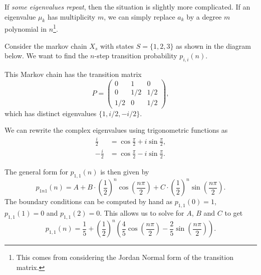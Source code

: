 \documentclass[a4paper]{scrartcl}
\begin{document}
If \emph{some eigenvalues repeat}, then the situation is slightly more complicated. If an eigenvalue $\mu_k$ has multiplicity $m$, we can simply replace $a_k$ by a degree $m$ polynomial in $n$\footnote{This comes from considering the Jordan Normal form of the transition matrix.}. 


\begin{example}
	Consider the markov chain $X_s$ with states $S = \{1, 2, 3\}$ as shown in the diagram below. We want to find the $n$-step transition probability $p_{i, i}(n)$.
	\begin{center}
	\end{center}

	This Markov chain has the transition matrix
	$$
	P = \begin{pmatrix}
		0 & 1 & 0 \\
		0 & 1/2 & 1/2 \\ 
		1/2 & 0 & 1/2
	\end{pmatrix},
	$$
	which has distinct eigenvalues $\{1, i/2, -i/2\}$.

	We can rewrite the complex eigenvalues using trigonometric functions as
	\begin{align*}
		\frac{i}{2} &= \cos \frac{\pi}{2} + i \sin \frac{\pi}{2}, \\ 
		-\frac{i}{2} &= \cos \frac{\pi}{2} - i \sin \frac{\pi}{2}.
	\end{align*}

	The general form for $p_{1,1}(n)$ is then given by
	$$
	p_{1n1}(n) = A + B \cdot \left(\frac{1}{2}\right)^n \cos \left(\frac{n \pi}{2}\right) + C \cdot \left(\frac{1}{2}\right)^n \sin\left(\frac{n \pi}{2}\right).
	$$
	The boundary conditions can be computed by hand as
	$p_{1,1}(0) = 1$, $p_{1,1}(1) = 0$ and $p_{1,1}(2) = 0$. This allows us to solve for $A$, $B$ and $C$ to get
	$$
	p_{1,1}(n) = \frac{1}{5} + \left(\frac{1}{2}\right)^n \left(\frac{4}{5}\cos\left(\frac{n \pi}{2}\right) - \frac{2}{5} \sin \left(\frac{n \pi}{2}\right)\right).
	$$
\end{example}
\end{document}
